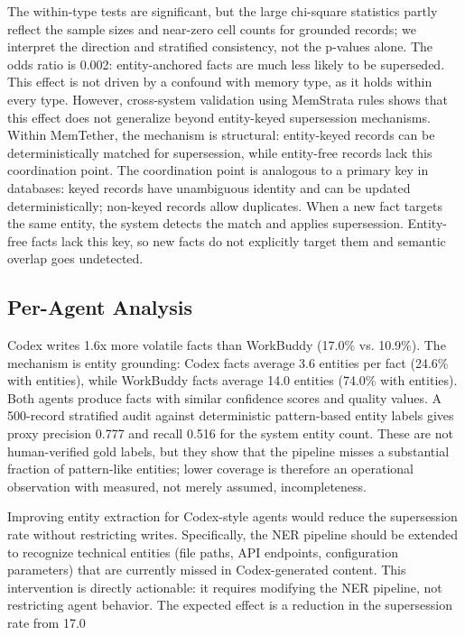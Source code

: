 \documentclass[sigconf,nonacm]{acmart}
\begin{document}
The within-type tests are significant, but the large chi-square statistics partly reflect the sample sizes and near-zero cell counts for grounded records; we interpret the direction and stratified consistency, not the p-values alone. The odds ratio is 0.002: entity-anchored facts are much less likely to be superseded. This effect is not driven by a confound with memory type, as it holds within every type. However, cross-system validation using MemStrata rules shows that this effect does not generalize beyond entity-keyed supersession mechanisms. Within MemTether, the mechanism is structural: entity-keyed records can be deterministically matched for supersession, while entity-free records lack this coordination point. The coordination point is analogous to a primary key in databases: keyed records have unambiguous identity and can be updated deterministically; non-keyed records allow duplicates. When a new fact targets the same entity, the system detects the match and applies supersession. Entity-free facts lack this key, so new facts do not explicitly target them and semantic overlap goes undetected.

\subsection{Per-Agent Analysis}
\label{sec:per-agent}

Codex writes 1.6x more volatile facts than WorkBuddy (17.0\% vs. 10.9\%). The mechanism is entity grounding: Codex facts average 3.6 entities per fact (24.6\% with entities), while WorkBuddy facts average 14.0 entities (74.0\% with entities). Both agents produce facts with similar confidence scores and quality values. A 500-record stratified audit against deterministic pattern-based entity labels gives proxy precision 0.777 and recall 0.516 for the system entity count. These are not human-verified gold labels, but they show that the pipeline misses a substantial fraction of pattern-like entities; lower coverage is therefore an operational observation with measured, not merely assumed, incompleteness.

Improving entity extraction for Codex-style agents would reduce the supersession rate without restricting writes. Specifically, the NER pipeline should be extended to recognize technical entities (file paths, API endpoints, configuration parameters) that are currently missed in Codex-generated content. This intervention is directly actionable: it requires modifying the NER pipeline, not restricting agent behavior. The expected effect is a reduction in the supersession rate from 17.0%
\end{document}

